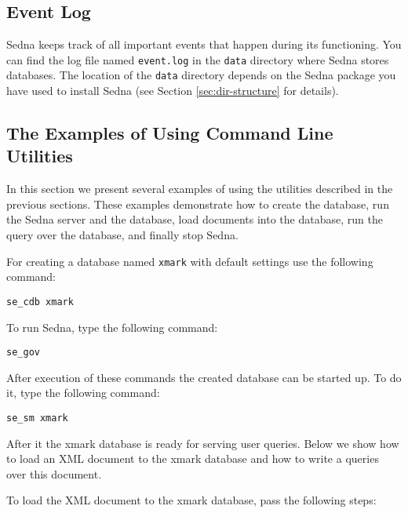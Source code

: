 \documentclass[a4paper,12pt]{article}
\begin{document}
\subsection{Event Log}
Sedna keeps track of all important events that happen during its functioning. You can find the log file named \verb!event.log! in the \verb!data! directory where Sedna stores databases. The location of the \verb!data! directory depends on the Sedna package you have used to install Sedna (see Section \ref{sec:dir-structure} for details).

\subsection{The Examples of Using Command Line Utilities}

In this section we present several examples of using the utilities described in the previous sections. These examples demonstrate how to create the database, run the Sedna server and the database, load documents into the database, run the query over the database, and finally stop Sedna.

For creating a database named \verb!xmark! with default settings use the following command:

\begin{verbatim}
se_cdb xmark
\end{verbatim}

To run Sedna, type the following command:

\begin{verbatim}
se_gov
\end{verbatim}

After execution of these commands the created database can be started up. To do it, type the following command:

\begin{verbatim}
se_sm xmark
\end{verbatim}

After it the xmark database is ready for serving user queries. Below we show how to load an XML document to the xmark database and how to write a queries over this document.

To load the XML document to the xmark database, pass the following steps:
\end{document}
